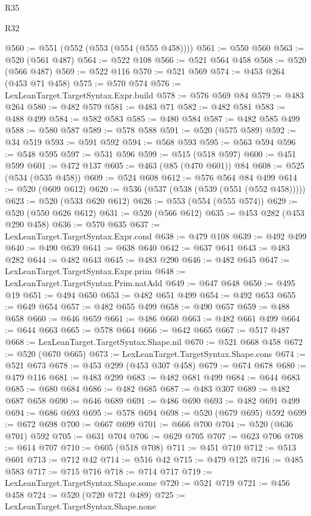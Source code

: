 \begin{lexlean}{R35}
\begin{lexlean}{R32}
\begin{coremodule}
{{{{{{{{{{{{{{{{{{{{{{{{{{{{{{{{{{{{{{{{{{{{{{{{{{{@560 := @551 (@552 (@553 (@554 (@555 @458))))
@561 := @550 @560
@563 := @520 (@561 @487)
@564 := @522 @108
@566 := @521 @564 @458
@568 := @520 (@566 @487)
@569 := @522 @116
@570 := @521 @569
@574 := @453 @264 (@453 @71 @458)
@575 := @570 @574
@576 := LexLeanTarget.TargetSyntax.Expr.build
@578 := @576 @569 @84
@579 := @483 @264
@580 := @482 @579
@581 := @483 @71
@582 := @482 @581
@583 := @488 @499
@584 := @582 @583
@585 := @480 @584
@587 := @482 @585 @499
@588 := @580 @587
@589 := @578 @588
@591 := @520 (@575 @589)
@592 := @34 @519
@593 := @591 @592
@594 := @568 @593
@595 := @563 @594
@596 := @548 @595
@597 := @531 @596
@599 := @515 (@518 @597)
@600 := @451 @599
@601 := @472 @137
@605 := @463 (@85 (@470 @601)) @84
@608 := @525 (@534 (@535 @458))
@609 := @524 @608
@612 := @576 @564 @84 @499
@614 := @520 (@609 @612)
@620 := @536 (@537 (@538 (@539 (@551 (@552 @458)))))
@623 := @520 (@533 @620 @612)
@626 := @553 (@554 (@555 @574))
@629 := @520 (@550 @626 @612)
@631 := @520 (@566 @612)
@635 := @453 @282 (@453 @290 @458)
@636 := @570 @635
@637 := LexLeanTarget.TargetSyntax.Expr.cond
@638 := @479 @108
@639 := @492 @499
@640 := @490 @639
@641 := @638 @640
@642 := @637 @641
@643 := @483 @282
@644 := @482 @643
@645 := @483 @290
@646 := @482 @645
@647 := LexLeanTarget.TargetSyntax.Expr.prim
@648 := LexLeanTarget.TargetSyntax.Prim.natAdd
@649 := @647 @648
@650 := @495 @19
@651 := @494 @650
@653 := @482 @651 @499
@654 := @492 @653
@655 := @649 @654
@657 := @482 @655 @499
@658 := @490 @657
@659 := @488 @658
@660 := @646 @659
@661 := @486 @660
@663 := @482 @661 @499
@664 := @644 @663
@665 := @578 @664
@666 := @642 @665
@667 := @517 @487
@668 := LexLeanTarget.TargetSyntax.Shape.nil
@670 := @521 @668 @458
@672 := @520 (@670 @665)
@673 := LexLeanTarget.TargetSyntax.Shape.cons
@674 := @521 @673
@678 := @453 @299 (@453 @307 @458)
@679 := @674 @678
@680 := @479 @116
@681 := @483 @299
@683 := @482 @681 @499
@684 := @644 @683
@685 := @680 @684
@686 := @482 @685
@687 := @483 @307
@689 := @482 @687 @658
@690 := @646 @689
@691 := @486 @690
@693 := @482 @691 @499
@694 := @686 @693
@695 := @578 @694
@698 := @520 (@679 @695) @592
@699 := @672 @698
@700 := @667 @699
@701 := @666 @700
@704 := @520 (@636 @701) @592
@705 := @631 @704
@706 := @629 @705
@707 := @623 @706
@708 := @614 @707
@710 := @605 (@518 @708)
@711 := @451 @710
@712 := @513 @601
@713 := @712 @42
@714 := @516 @42
@715 := @479 @125
@716 := @485 @583
@717 := @715 @716
@718 := @714 @717
@719 := LexLeanTarget.TargetSyntax.Shape.some
@720 := @521 @719
@721 := @456 @458
@724 := @520 (@720 @721 @489)
@725 := LexLeanTarget.TargetSyntax.Shape.none
}}}}}}}}}}}}}}}}}}}}}}}}}}}}}}}}}}}}}}}}}}}}}}}}}}}
\end{coremodule}
\end{lexlean}
\end{lexlean}
